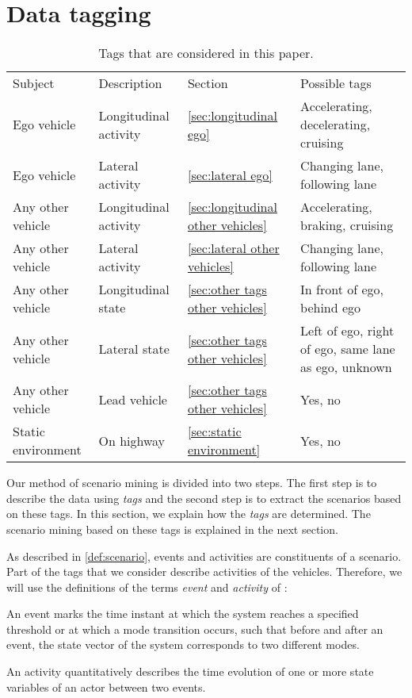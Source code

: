 \section{Data tagging}
\label{sec:tagging}

\begin{table*}
	\cstarta
	\centering
	\caption{\cstarta Tags that are considered in this paper.\cenda}
	\label{tab:tags}
	\begin{tabular}{llll}
		\toprule
		Subject & Description & Section & Possible tags \\ \otoprule
		Ego vehicle & Longitudinal activity & \cref{sec:longitudinal ego} & Accelerating, decelerating, cruising \\
		Ego vehicle & Lateral activity & \cref{sec:lateral ego} & Changing lane, following lane \\
		Any other vehicle & Longitudinal activity & \cref{sec:longitudinal other vehicles} & Accelerating, braking, cruising \\
		Any other vehicle & Lateral activity & \cref{sec:lateral other vehicles} & Changing lane, following lane \\
		Any other vehicle & Longitudinal state & \cref{sec:other tags other vehicles} & In front of ego, behind ego \\
		Any other vehicle & Lateral state & \cref{sec:other tags other vehicles} & Left of ego, right of ego, same lane as ego, unknown \\
		Any other vehicle & Lead vehicle & \cref{sec:other tags other vehicles} & Yes, no \\
		Static environment & On highway & \cref{sec:static environment} & Yes, no \\ 
		\bottomrule
	\end{tabular}
	\cenda
\end{table*}

\cstarta
Our method of scenario mining is divided into two steps. 
The first step is to describe the data using \emph{tags} and the second step is to extract the scenarios based on these tags. 
In this section, we explain how the \emph{tags} are determined. 
The scenario mining based on these tags is explained in the next section.

As described in \cref{def:scenario}, events and activities are constituents of a scenario. 
Part of the tags that we consider describe activities of the vehicles.
Therefore, we will use the definitions of the terms \emph{event} and \emph{activity} of \autocite{degelder2018ontology}:\cenda
\begin{definition}
	\label{def:event}
	An event marks the time instant at which the system reaches a specified threshold or at which a mode transition occurs, such that before and after an event, the state vector of the system corresponds to two different modes.
\end{definition}
\begin{definition}
	\label{def:activity}
	An activity quantitatively describes the time evolution of one or more state variables of an actor between two events.
\end{definition}

